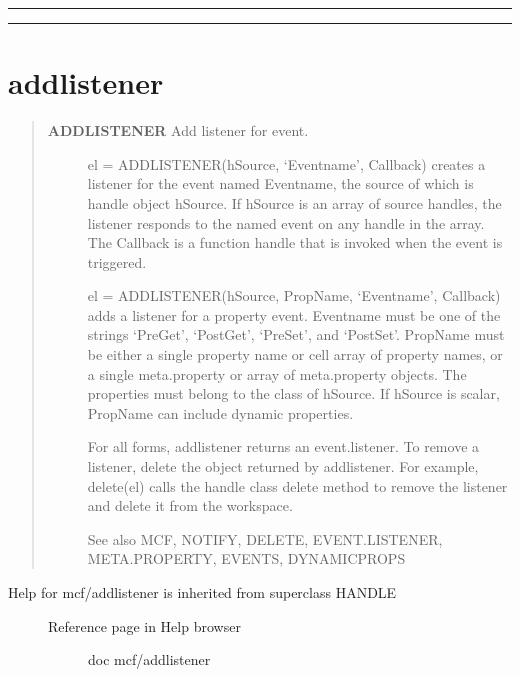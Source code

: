 \documentclass[letterpaper,10pt,english]{sphinxmanual}
\begin{document}
\bigskip\hrule{}\bigskip



\bigskip\hrule{}\bigskip



\section{addlistener}
\label{classes/utils/@mcf/mcf:addlistener}\label{classes/utils/@mcf/mcf:id1}\begin{quote}
\begin{description}
\item[{\textbf{ADDLISTENER}   Add listener for event.}] \leavevmode
el = ADDLISTENER(hSource, `Eventname', Callback) creates a listener
for the event named Eventname, the source of which is handle object
hSource.  If hSource is an array of source handles, the listener
responds to the named event on any handle in the array.  The Callback
is a function handle that is invoked when the event is triggered.

el = ADDLISTENER(hSource, PropName, `Eventname', Callback) adds a
listener for a property event.  Eventname must be one of the strings
`PreGet', `PostGet', `PreSet', and `PostSet'.  PropName must be either
a single property name or cell array of property names, or a single
meta.property or array of meta.property objects.  The properties must
belong to the class of hSource.  If hSource is scalar, PropName can
include dynamic properties.

For all forms, addlistener returns an event.listener.  To remove a
listener, delete the object returned by addlistener.  For example,
delete(el) calls the handle class delete method to remove the listener
and delete it from the workspace.

See also MCF, NOTIFY, DELETE, EVENT.LISTENER, META.PROPERTY, EVENTS,
DYNAMICPROPS

\end{description}
\end{quote}
\begin{description}
\item[{Help for mcf/addlistener is inherited from superclass HANDLE}] \leavevmode\begin{description}
\item[{Reference page in Help browser}] \leavevmode
doc mcf/addlistener

\end{description}

\end{description}
\end{document}
